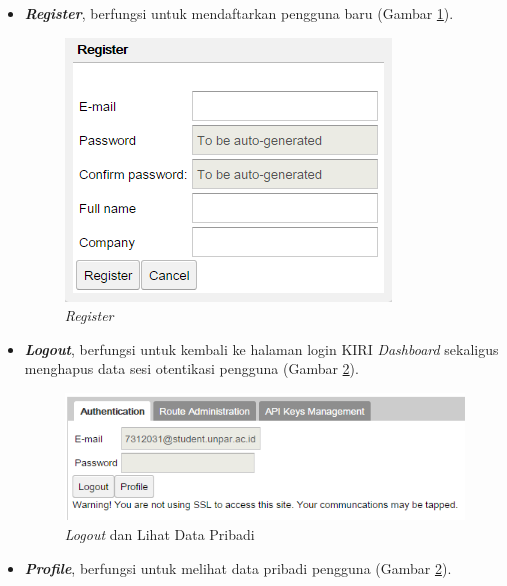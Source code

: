 \begin{enumerate}
\begin{itemize}
		\item \textbf{\textit{Register}}, berfungsi untuk mendaftarkan pengguna baru (Gambar \ref{fig:3_tampilan_register}).\\
		\begin{figure}[htbp]
			\centering
				\includegraphics[scale=0.7]{Gambar/3_tampilan_register.PNG}
			\caption{\textit{Register}}
			\label{fig:3_tampilan_register}
		\end{figure}
		
		\item \textbf{\textit{Logout}}, berfungsi untuk kembali ke halaman login KIRI \textit{Dashboard} sekaligus menghapus data sesi otentikasi pengguna (Gambar \ref{fig:3_tampilan_logout}).\\
		\begin{figure}[htbp]
			\centering
				\includegraphics[scale=0.7]{Gambar/3_tampilan_logout.png}
			\caption{\textit{Logout} dan Lihat Data Pribadi}
			\label{fig:3_tampilan_logout}
		\end{figure}

		\item \textbf{\textit{Profile}}, berfungsi untuk melihat data pribadi pengguna (Gambar \ref{fig:3_tampilan_logout}).


\end{itemize}
\end{enumerate}
